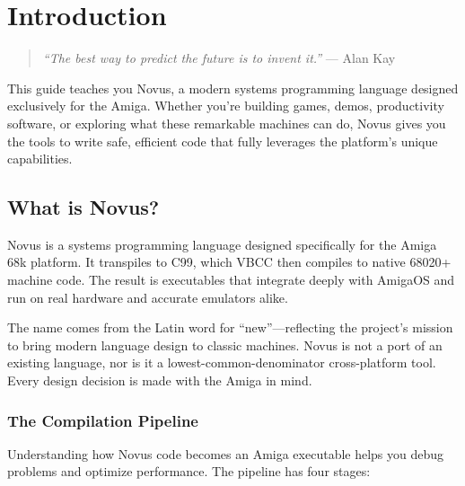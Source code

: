 \chapter{Introduction}

\begin{quote}
\textit{``The best way to predict the future is to invent it.''} --- Alan Kay
\end{quote}

\vspace{1em}

This guide teaches you Novus, a modern systems programming language designed exclusively for the Amiga. Whether you're building games, demos, productivity software, or exploring what these remarkable machines can do, Novus gives you the tools to write safe, efficient code that fully leverages the platform's unique capabilities.

\section{What is Novus?}

Novus is a systems programming language designed specifically for the Amiga 68k platform. It transpiles to C99, which VBCC then compiles to native 68020+ machine code. The result is executables that integrate deeply with AmigaOS and run on real hardware and accurate emulators alike.

The name comes from the Latin word for ``new''---reflecting the project's mission to bring modern language design to classic machines. Novus is not a port of an existing language, nor is it a lowest-common-denominator cross-platform tool. Every design decision is made with the Amiga in mind.

\subsection{The Compilation Pipeline}

Understanding how Novus code becomes an Amiga executable helps you debug problems and optimize performance. The pipeline has four stages:

\begin{center}
\end{center}

